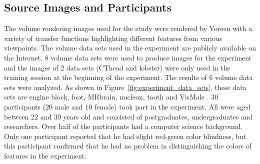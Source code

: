 \subsection{Source Images and Participants}
The volume rendering images used for the study were rendered by Voreen \cite{meyer-spradow_voreen:_2009} with a variety of transfer functions highlighting different features from various viewpoints. The volume data sets used in the experiment are publicly available on the Internet.
8 volume data sets were used to produce images for the experiment and the images of 2 data sets (CThead and lobster) were only used in the training session at the beginning of the experiment.
The results of 6 volume data sets were analyzed. As shown in Figure~\ref{fig:experiment_data_sets}, these data sets are engine block, foot, MRbrain, nucleon, tooth and VisMale
\cite{website:Roettger_volume_2013} \cite{website:Voreen_datasets_2013}.
30 participants (20 male and 10 female) took part in the experiment. All were aged between 22 and 39 years old and consisted of postgraduates, undergraduates and researchers. Over half of the participants had a computer science background. Only one participant reported that he had slight red-green color blindness, but this participant confirmed that he had no problem in distinguishing the colors of features in the experiment.

